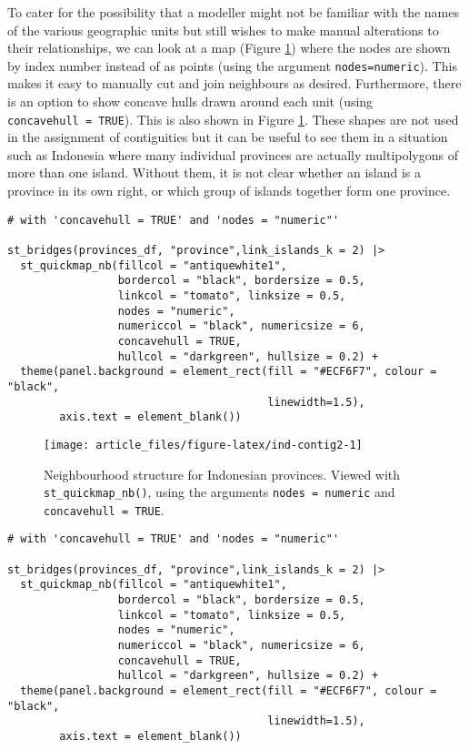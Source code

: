 To cater for the possibility that a modeller might not be familiar with the names of the various geographic units but still wishes to make manual alterations to their relationships, we can look at a map (Figure \ref{fig:ind-contig2}) where the nodes are shown by
index number instead of as points (using the argument \texttt{nodes=\textquotesingle{}numeric\textquotesingle{}}). This makes it easy to manually cut
and join neighbours as desired. Furthermore, there is an option to
show concave hulls drawn around each unit (using \texttt{concavehull\ =\ TRUE}). This is also shown in Figure \ref{fig:ind-contig2}. These shapes are not used in the assignment of contiguities but it can be useful to see them in a situation such as Indonesia where many individual provinces are actually multipolygons of more than one island. Without them, it is not clear whether an island is a province in its own right, or which group of islands together form one province.



\begin{verbatim}
# with 'concavehull = TRUE' and 'nodes = "numeric"'

st_bridges(provinces_df, "province",link_islands_k = 2) |> 
  st_quickmap_nb(fillcol = "antiquewhite1", 
                 bordercol = "black", bordersize = 0.5, 
                 linkcol = "tomato", linksize = 0.5, 
                 nodes = "numeric", 
                 numericcol = "black", numericsize = 6, 
                 concavehull = TRUE, 
                 hullcol = "darkgreen", hullsize = 0.2) + 
  theme(panel.background = element_rect(fill = "#ECF6F7", colour = "black", 
                                        linewidth=1.5),
        axis.text = element_blank())
\end{verbatim}

\begin{figure}

{\centering \texttt{[image: article\_files/figure-latex/ind-contig2-1]} 

}

\caption{Neighbourhood structure for Indonesian provinces. Viewed with \texttt{st\_quickmap\_nb()}, using the arguments \texttt{nodes\ =\ \textquotesingle{}numeric\textquotesingle{}} and \texttt{concavehull\ =\ TRUE}.}\label{fig:ind-contig2}
\end{figure}

\begin{verbatim}
# with 'concavehull = TRUE' and 'nodes = "numeric"'

st_bridges(provinces_df, "province",link_islands_k = 2) |> 
  st_quickmap_nb(fillcol = "antiquewhite1", 
                 bordercol = "black", bordersize = 0.5, 
                 linkcol = "tomato", linksize = 0.5, 
                 nodes = "numeric", 
                 numericcol = "black", numericsize = 6, 
                 concavehull = TRUE, 
                 hullcol = "darkgreen", hullsize = 0.2) + 
  theme(panel.background = element_rect(fill = "#ECF6F7", colour = "black", 
                                        linewidth=1.5),
        axis.text = element_blank())
\end{verbatim}

